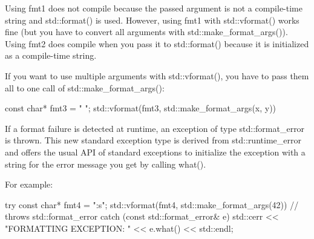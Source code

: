 Using fmt1 does not compile because the passed argument is not a compile-time string and std::format() is used. However, using fmt1 with std::vformat() works fine (but you have to convert all arguments with std::make\_format\_args()). Using fmt2 does compile when you pass it to std::format() because it is initialized as a compile-time string.

If you want to use multiple arguments with std::vformat(), you have to pass them all to one call of std::make\_format\_args():

\begin{cpp}
const char* fmt3 = "{} {}";
std::vformat(fmt3, std::make_format_args(x, y))
\end{cpp}

If a format failure is detected at runtime, an exception of type std::format\_error is thrown. This new standard exception type is derived from std::runtime\_error and offers the usual API of standard exceptions to initialize the exception with a string for the error message you get by calling what().

For example:

\begin{cpp}
try {
	const char* fmt4 = "{:s}";
	std::vformat(fmt4, std::make_format_args(42)) // throws std::format_error
}
catch (const std::format_error& e) {
	std::cerr << "FORMATTING EXCEPTION: " << e.what() << std::endl;
}
\end{cpp}

















